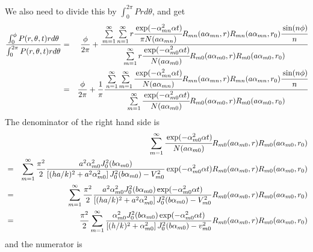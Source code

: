 \documentclass{article}
\begin{document}
%
We also need to divide this by $\int_0^{2\pi} P rd\theta$, and get
%
\begin{eqnarray}
    \frac{\int_0^{\phi} P(r, \theta, t) rd\theta}
         {\int_0^{2\pi} P(r, \theta, t) rd\theta}
    &=& \frac{\phi}{2\pi} +
    \cfrac{
        \sum\limits_{m=1}^{\infty}\sum\limits_{n=1}^{\infty}
        r\cfrac{\exp(-\alpha_{mn}^2\alpha t)}{\pi N(a\alpha_{mn})}
        R_{mn}(a\alpha_{mn}, r) R_{mn}(a\alpha_{mn}, r_0) \cfrac{\sin(n\phi)}{n}
    }{
        \sum\limits_{m=1}^{\infty}
        r\cfrac{\exp(-\alpha_{m0}^2\alpha t)}{N(a\alpha_{m0})}
        R_{m0}(a\alpha_{m0}, r) R_{m0}(a\alpha_{m0}, r_0)
    }
\nonumber\\
    &=& \frac{\phi}{2\pi} + \frac{1}{\pi}
    \cfrac{
        \sum\limits_{n=1}^{\infty}\sum\limits_{m=1}^{\infty}
        \cfrac{\exp(-\alpha_{mn}^2\alpha t)}{N(a\alpha_{mn})}
        R_{mn}(a\alpha_{mn}, r) R_{mn}(a\alpha_{mn}, r_0) \cfrac{\sin(n\phi)}{n}
    }{
        \sum\limits_{m=1}^{\infty}
        \cfrac{\exp(-\alpha_{m0}^2\alpha t)}{N(a\alpha_{m0})}
        R_{m0}(a\alpha_{m0}, r) R_{m0}(a\alpha_{m0}, r_0)
    }
\end{eqnarray}
%
The denominator of the right hand side is
%
\begin{eqnarray}
    & & \sum\limits_{m=1}^{\infty}
        \cfrac{\exp(-\alpha_{m0}^2\alpha t)}{N(a\alpha_{m0})}
        R_{m0}(a\alpha_{m0}, r) R_{m0}(a\alpha_{m0}, r_0)
\nonumber\\
    &=& \sum\limits_{m=1}^{\infty}
        \frac{\pi^2}{2} \frac{a^2\alpha_{m0}^2 J_0^2(b\alpha_{m0})}
        {\left[(ha/k)^2 + a^2\alpha_{m0}^2\right]J_0^2(b\alpha_{m0}) - V_{m0}^2}
        \exp(-\alpha_{m0}^2\alpha t)
        R_{m0}(a\alpha_{m0}, r) R_{m0}(a\alpha_{m0}, r_0)
\nonumber\\
    &=& \sum\limits_{m=1}^{\infty} \frac{\pi^2}{2}
        \frac{a^2\alpha_{m0}^2 J_0^2(b\alpha_{m0})\exp(-\alpha_{m0}^2\alpha t)}
        {\left[(ha/k)^2 + a^2\alpha_{m0}^2\right]J_0^2(b\alpha_{m0}) - V_{m0}^2}
        R_{m0}(a\alpha_{m0}, r) R_{m0}(a\alpha_{m0}, r_0)
\nonumber\\
    &=& \frac{\pi^2}{2} \sum\limits_{m=1}^{\infty}
        \frac{\alpha_{m0}^2 J_0^2(b\alpha_{m0})\exp(-\alpha_{m0}^2\alpha t)}
        {\left[(h/k)^2 + \alpha_{m0}^2\right]J_0^2(b\alpha_{m0}) - v_{m0}^2}
        R_{m0}(a\alpha_{m0}, r) R_{m0}(a\alpha_{m0}, r_0)
\end{eqnarray}
%
and the numerator is
%
\end{document}
